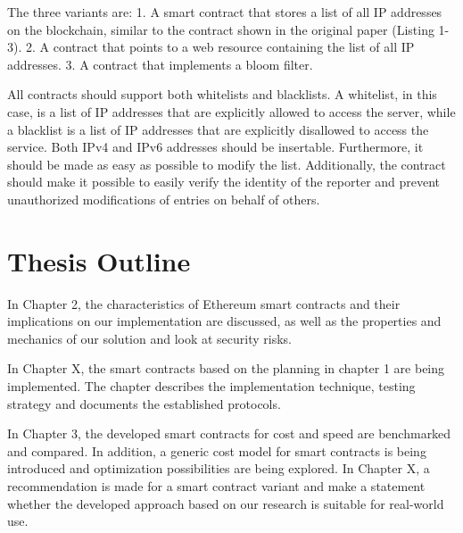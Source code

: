 The three variants are: 1. A smart contract that stores a list of all IP addresses on the blockchain, similar to the contract shown in the original paper \cite{OriginalPaper} (Listing 1-3). 2. A contract that points to a web resource containing the list of all IP addresses. 3. A contract that implements a bloom filter.

All contracts should support both whitelists and blacklists.
A whitelist, in this case, is a list of IP addresses that are explicitly allowed to access the server, while a blacklist is a list of IP addresses that are explicitly disallowed to access the service.
Both IPv4 and IPv6 addresses should be insertable. Furthermore, it should be made as easy as possible to modify the list. Additionally, the contract should make it possible to easily verify the identity of the reporter and prevent unauthorized modifications of entries on behalf of others. 

\section{Thesis Outline}

In Chapter 2, the characteristics of Ethereum smart contracts and their implications on our implementation are discussed, as well as the properties and mechanics of our solution and look at security risks.

In Chapter X, the smart contracts based on the planning in chapter 1 are being implemented. The chapter describes the implementation technique, testing strategy and documents the established protocols.

In Chapter 3, the developed smart contracts for cost and speed are benchmarked and compared. In addition, a generic cost model for smart contracts is being introduced and optimization possibilities are being explored.
In Chapter X, a recommendation is made for a smart contract variant and make a statement whether the developed approach based on our research is suitable for real-world use.
